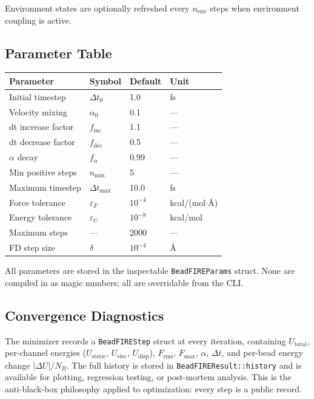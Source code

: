 ﻿\documentclass[11pt]{article}
\newcommand{\type}[1]{\texttt{#1}}
\begin{document}
Environment states are optionally refreshed every $n_{\mathrm{env}}$ steps
when environment coupling is active.
\subsection{Parameter Table}

\begin{center}
\begin{tabular}{llll}
\toprule
Parameter & Symbol & Default & Unit \\
\midrule
Initial timestep      & $\Delta t_0$         & 1.0   & fs \\
Velocity mixing       & $\alpha_0$           & 0.1   & --- \\
dt increase factor    & $f_{\mathrm{inc}}$   & 1.1   & --- \\
dt decrease factor    & $f_{\mathrm{dec}}$   & 0.5   & --- \\
$\alpha$ decay        & $f_\alpha$           & 0.99  & --- \\
Min positive steps    & $n_{\min}$           & 5     & --- \\
Maximum timestep      & $\Delta t_{\max}$    & 10.0  & fs \\
Force tolerance       & $\varepsilon_F$      & $10^{-4}$ & kcal/(mol$\cdot$\AA) \\
Energy tolerance      & $\varepsilon_U$      & $10^{-8}$ & kcal/mol \\
Maximum steps         & ---                  & 2000  & --- \\
FD step size          & $\delta$             & $10^{-4}$ & \AA \\
\bottomrule
\end{tabular}
\end{center}

All parameters are stored in the inspectable \type{BeadFIREParams} struct.
None are compiled in as magic numbers; all are overridable from the CLI.

\subsection{Convergence Diagnostics}

The minimizer records a \type{BeadFIREStep} struct at every iteration,
containing $U_{\mathrm{total}}$, per-channel energies ($U_{\mathrm{steric}}$,
$U_{\mathrm{elec}}$, $U_{\mathrm{disp}}$), $F_{\mathrm{rms}}$,
$F_{\max}$, $\alpha$, $\Delta t$, and per-bead energy change
$|\Delta U|/N_B$. The full history is stored in
\type{BeadFIREResult::history} and is available for plotting, regression
testing, or post-mortem analysis. This is the anti-black-box philosophy
applied to optimization: every step is a public record.
\end{document}
